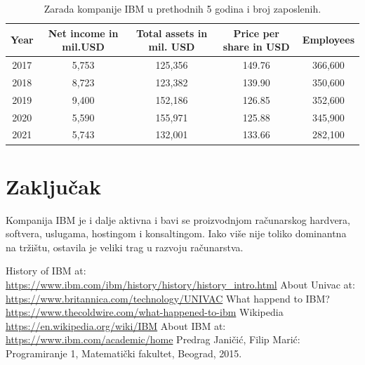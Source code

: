\documentclass[a4paper]{article}
\begin{document}
\begin{table}[h!]
\begin{center}
\caption{Zarada kompanije IBM u prethodnih 5 godina i broj zaposlenih. \cite{tabela}}
\begin{tabular}{|c|c|c|c|c|} \hline
Year& Net income in mil.USD& Total assets in mil. USD& Price per share in USD& Employees \\ \hline
2017	&5,753	&125,356	&149.76	&366,600\\ \hline
2018	&8,723	&123,382	&139.90	&350,600\\ \hline
2019	&9,400	&152,186	&126.85	&352,600\\ \hline
2020	&5,590	&155,971	&125.88	&345,900\\ \hline
2021	&5,743	&132,001	&133.66	&282,100\\ \hline
\end{tabular}
\label{tab:tabela1}
\end{center}
\end{table}

\section{Zaključak}
Kompanija IBM je i dalje aktivna i bavi se proizvodnjom računarskog hardvera, softvera, uslugama, hostingom i konsaltingom. Iako više nije toliko dominantna na tržištu, ostavila je veliki trag u razvoju računarstva. 

\renewcommand{\refname}{Literatura}
\begin{thebibliography}{10}

 History of IBM at:\\ \url{https://www.ibm.com/ibm/history/history/history_intro.html}
 About Univac at: \url{https://www.britannica.com/technology/UNIVAC}
 What happend to IBM?\\ \url{https://www.thecoldwire.com/what-happened-to-ibm}
 Wikipedia \url{https://en.wikipedia.org/wiki/IBM} %
 About IBM at: \url{https://www.ibm.com/academic/home}
 Predrag Janičić, Filip Marić: Programiranje 1, Matematički fakultet, Beograd, 2015.
\end{thebibliography}
\end{document}
